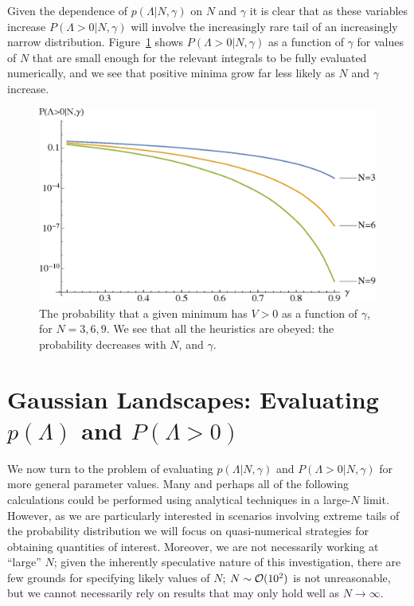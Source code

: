 \documentclass[12pt]{article}
\begin{document}
Given the dependence of $p(\Lambda|N,\gamma)$ on $N$ and $\gamma$ it is clear that as these variables increase $P(\Lambda>0|N,\gamma)$ will involve the increasingly rare tail of an increasingly narrow distribution. Figure~\ref{N6} shows $P(\Lambda>0|N,\gamma)$ as a function of $\gamma$ for values of $N$ that are small enough for the relevant integrals to be fully evaluated numerically, and we see that positive minima grow far less likely as $N$ and $\gamma$ increase. 

\begin{figure}
  \centering
  \includegraphics[width=.6 \linewidth]{N369.eps}
  \caption{The probability that a given minimum has $V > 0$ as a function of $\gamma$, for $N=3, 6, 9$. We see that all the heuristics are obeyed: the probability decreases with $N$, and  $\gamma$.}
  \label{N6}
  \end{figure}


\section{Gaussian Landscapes: Evaluating $p(\Lambda)$ and $P(\Lambda>0)$} \label{PeakNumbers}

We now turn to the problem of evaluating $p(\Lambda|N,\gamma)$ and $P(\Lambda>0|N,\gamma)$  for more general parameter values. Many and perhaps all of the following calculations could be performed using analytical techniques in a large-$N$ limit. However,  as we are particularly interested in scenarios involving extreme tails of  the probability distribution we will focus on quasi-numerical strategies for obtaining quantities of interest. Moreover, we are  not necessarily working at ``large'' $N$; given the inherently speculative nature of this investigation, there are few  grounds for specifying likely values of $N$;  $N\sim{\cal O}(10^2)$ is not unreasonable, but we cannot necessarily rely on results that may only hold well as $N\rightarrow \infty$. 
\end{document}
